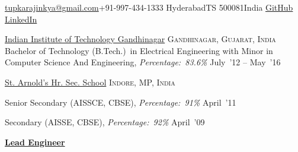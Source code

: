 \documentclass[10pt,a4paper]{article}
\begin{document}
\sloppy  %



\nobreakvspace{0.3em}  %

\noindent\href{mailto:tupkarajinkya@gmail.com}{tupkarajinkya\mbox{}@\mbox{}gmail.com}\sbull +91-997-434-1333\sbull
Hyderabad\sbull TS 500081\sbull India
\sbull\href{https://github.com/ajinkyaTupkar}{GitHub}
\sbull\href{https://www.linkedin.com/in/ajinkya-tupkar-jain-a9b55157/}{LinkedIn}
\spacedhrule{0.5em}{-0.4em}


\headedsection
  {\href{}{Indian Institute of Technology Gandhinagar}}
  {\textsc{Gandhinagar, Gujarat, India}} {%
  \headedsubsection
    {Bachelor of Technology (B.Tech.)~in Electrical Engineering with Minor in Computer Science And Engineering, \textit{Percentage:~83.6\%}}
    {July~'12 -- May~'16} {}
}

\headedsection
{\href{}{St. Arnold's Hr. Sec. School}}
{\textsc{Indore, MP, India}} {%
  \headedsubsection
  {Senior Secondary (AISSCE, CBSE), \textit{Percentage:~91\%}}
  {April~'11} {}

  \headedsubsection
  {Secondary (AISSE, CBSE), \textit{Percentage:~92\%}}
  {April~'09} {}
  
}

\spacedhrule{0.5em}{-0.4em}


\headedsection  %
  {\href{}{\textbf{Lead Engineer}}}
  {\textbf{}}
\end{document}
